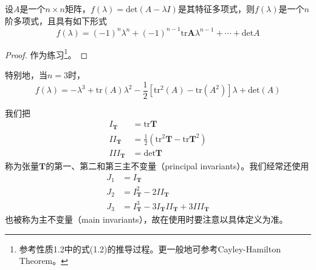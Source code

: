 \documentclass[main.tex]{subfiles}
\begin{document}
\begin{theorem}
设$A$是一个$n\times n$矩阵，$f\left(\lambda\right)=\mathrm{det}\left(A-\lambda I\right)$是其特征多项式，则$f\left(\lambda\right)$是一个$n$阶多项式，且具有如下形式
\[
f\left(\lambda\right)=\left(-1\right)^n\lambda^n+\left(-1\right)^{n-1}\mathrm{tr}\mathbf{A}\lambda^{n-1}+\cdots+\mathrm{det}A
\]
\end{theorem}
\begin{proof}
作为练习\footnote{参考\cite[\S,p.~118]{周胜林2012线性代数}性质1.2中的式(1.2)的推导过程。更一般地可参考Cayley-Hamilton Theorem。}。
\end{proof}

特别地，当$n=3$时，
\[
f\left(\lambda\right)=
-\lambda^3+\mathrm{tr}\left(A\right)\lambda^2-\frac{1}{2}\left[\mathrm{tr}^2\left(A\right)-\mathrm{tr}\left(A^2\right)\right]\lambda+\mathrm{det}\left(A\right)\]

我们把
\begin{align*}
I_\mathbf{T}&=\mathrm{tr}\mathbf{T}\\
II_\mathbf{T}&=\frac{1}{2}\left(\mathrm{tr}^2\mathbf{T}-\mathrm{tr}\mathbf{T}^2\right)\\
III_\mathbf{T}&=\mathrm{det}\mathbf{T}
\end{align*}
称为张量$\mathbf{T}$的第一、第二和第三主不变量（principal invariants）。我们经常还使用
\begin{align*}
    J_1&=I_\mathbf{T}\\
    J_2&=I_\mathbf{T}^2-2II_\mathbf{T}\\
    J_3&=I_\mathbf{T}^3-3I_\mathbf{T}II_\mathbf{T}+3III_\mathbf{T}
\end{align*}
也被称为主不变量（main invariants），故在使用时要注意以具体定义为准。
\end{document}
